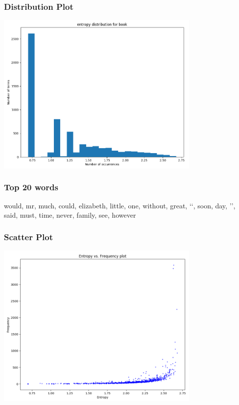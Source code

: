 \documentclass{article}
\begin{document}
\subsubsection{Distribution Plot}
\begin{flushleft}
	\includegraphics[width=0.75\textwidth]{./images/entropy-distribution-book.png}
\end{flushleft}
\subsubsection{Top 20 words}
\begin{flushleft}
    would, mr, much, could, elizabeth, little, one, without, great, \lq\lq, soon, day, \rq\rq, said, must, time, never, family, see, however \\
\end{flushleft}
\subsubsection{Scatter Plot}
\begin{flushleft}
	\includegraphics[width=0.75\textwidth]{./images/scatter-plot.png}
\end{flushleft}
\end{document}
